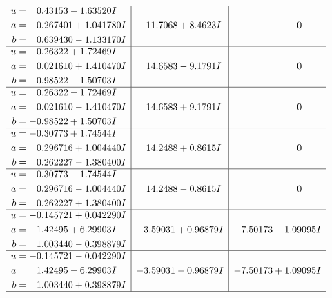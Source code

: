 \documentclass[1p]{elsarticle_modified}
\theoremstyle{definition}
\begin{document}
$$\begin{array}{c|c|c}
\begin{aligned}
u &= \phantom{-}0.43153 - 1.63520 I \\
a &= \phantom{-}0.267401 + 1.041780 I \\
b &= \phantom{-}0.639430 - 1.133170 I\end{aligned}
 & \phantom{-}11.7068 + 8.4623 I & \phantom{-0.000000 } 0 \\ \hline\begin{aligned}
u &= \phantom{-}0.26322 + 1.72469 I \\
a &= \phantom{-}0.021610 + 1.410470 I \\
b &= -0.98522 - 1.50703 I\end{aligned}
 & \phantom{-}14.6583 - 9.1791 I & \phantom{-0.000000 } 0 \\ \hline\begin{aligned}
u &= \phantom{-}0.26322 - 1.72469 I \\
a &= \phantom{-}0.021610 - 1.410470 I \\
b &= -0.98522 + 1.50703 I\end{aligned}
 & \phantom{-}14.6583 + 9.1791 I & \phantom{-0.000000 } 0 \\ \hline\begin{aligned}
u &= -0.30773 + 1.74544 I \\
a &= \phantom{-}0.296716 + 1.004440 I \\
b &= \phantom{-}0.262227 - 1.380400 I\end{aligned}
 & \phantom{-}14.2488 + 0.8615 I & \phantom{-0.000000 } 0 \\ \hline\begin{aligned}
u &= -0.30773 - 1.74544 I \\
a &= \phantom{-}0.296716 - 1.004440 I \\
b &= \phantom{-}0.262227 + 1.380400 I\end{aligned}
 & \phantom{-}14.2488 - 0.8615 I & \phantom{-0.000000 } 0 \\ \hline\begin{aligned}
u &= -0.145721 + 0.042290 I \\
a &= \phantom{-}1.42495 + 6.29903 I \\
b &= \phantom{-}1.003440 - 0.398879 I\end{aligned}
 & -3.59031 + 0.96879 I & -7.50173 - 1.09095 I \\ \hline\begin{aligned}
u &= -0.145721 - 0.042290 I \\
a &= \phantom{-}1.42495 - 6.29903 I \\
b &= \phantom{-}1.003440 + 0.398879 I\end{aligned}
 & -3.59031 - 0.96879 I & -7.50173 + 1.09095 I\\
 \hline 
 \end{array}$$\newpage\newpage\renewcommand{\arraystretch}{1}
\end{document}
